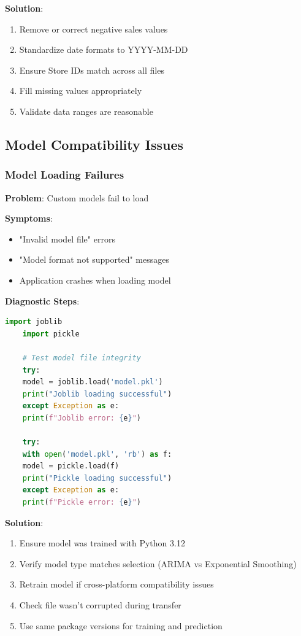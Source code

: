 \textbf{Solution}:
\begin{enumerate}
	\item Remove or correct negative sales values
	\item Standardize date formats to YYYY-MM-DD
	\item Ensure Store IDs match across all files
	\item Fill missing values appropriately
	\item Validate data ranges are reasonable
\end{enumerate}

\subsection{Model Compatibility Issues}

\subsubsection{Model Loading Failures}

\textbf{Problem}: Custom models fail to load

\textbf{Symptoms}:
\begin{itemize}
	\item "Invalid model file" errors
	\item "Model format not supported" messages
	\item Application crashes when loading model
\end{itemize}

\textbf{Diagnostic Steps}:
\begin{lstlisting}[language=python,basicstyle=\color{blue}]
	import joblib
	import pickle
	
	# Test model file integrity
	try:
	model = joblib.load('model.pkl')
	print("Joblib loading successful")
	except Exception as e:
	print(f"Joblib error: {e}")
	
	try:
	with open('model.pkl', 'rb') as f:
	model = pickle.load(f)
	print("Pickle loading successful")
	except Exception as e:
	print(f"Pickle error: {e}")
\end{lstlisting}

\textbf{Solution}:
\begin{enumerate}
	\item Ensure model was trained with Python 3.12
	\item Verify model type matches selection (ARIMA vs Exponential Smoothing)
	\item Retrain model if cross-platform compatibility issues
	\item Check file wasn't corrupted during transfer
	\item Use same package versions for training and prediction
\end{enumerate}

